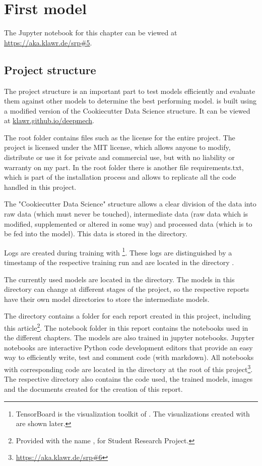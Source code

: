 \section{First model}

The Jupyter notebook for this chapter can be viewed at \url{https://aka.klawr.de/srp\#5}.

\subsection{Project structure}

The project structure is an important part to test models efficiently and evaluate them against other models to determine the best performing model.
 is built using a modified version of the Cookiecutter Data Science \cite{drivendata2019} structure. It can be viewed at \url{klawr.github.io/deepmech}.

The root folder contains files such as the license for the entire project.
The project is licensed under the MIT license, which allows anyone to modify, distribute or use it for private and commercial use, but with no liability or warranty on my part.
In the root folder there is another file requirements.txt, which is part of the installation process and allows to replicate all the code handled in this project.

The "Cookiecutter Data Science" structure allows a clear division of the data into raw data (which must never be touched), intermediate data (raw data which is modified, supplemented or altered in some way) and processed data (which is to be fed into the model).
This data is stored in the  directory.

Logs are created during training with \footnote{TensorBoard is the visualization toolkit of . The visualizations created with  are shown later.}.
These logs are distinguished by a timestamp of the respective training run and are located in the directory .

The currently used models are located in the  directory.
The models in this directory can change at different stages of the project, so the respective reports have their own model directories to store the intermediate models.

The  directory contains a folder for each report created in this project, including this article\footnote{Provided with the name , for Student Research Project.}.
The notebook folder in this report contains the  notebooks \cite{Jupyter2019} used in the different chapters.
The models are also trained in jupyter notebooks. 
Jupyter notebooks are interactive Python code development editors that provide an easy way to efficiently write, test and comment code (with markdown).
All notebooks with corresponding code are located in the  directory at the root of this project\footnote{\url{https://aka.klawr.de/srp\#6}}.
The respective directory also contains the code used, the trained models, images and the documents created for the creation of this report.

